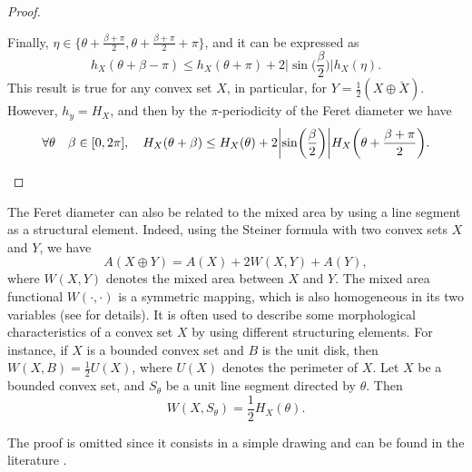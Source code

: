 \documentclass[numbers,compress,v1.0.1]{vmsta}
\theoremstyle{definition}
\begin{document}
\begin{proof}
\begin{enumerate}[1,~2,~3.]
Finally, $\eta\in\lbrace\theta+\frac{\beta+\pi}{2},\theta+\frac{\beta
+\pi}{2}+\pi\rbrace$, and it can be expressed as
%
\begin{equation*}
h_X(\theta+\beta-\pi)\leq h_X(\theta+\pi)+2\biggl\vert\sin
\biggl(\frac{\beta
}{2}\biggr)\biggr\vert h_X(\eta).
\end{equation*}
%
This result is true for any convex set $X$, in particular, for $Y=\frac
{1}{2}( X\oplus\breve{X})$. However, $h_y=H_X$, and then by the $\pi
$-periodicity of the Feret diameter we have
%
\begin{equation*}
\forall\theta \quad \beta\in[0,2\pi], \quad H_X(\theta+\beta)\leq
H_X(\theta)+ 2\biggl\vert\sin\biggl(\frac{\beta}{2}\biggr)\biggr\vert
H_X\biggl(\theta+\frac{\beta+\pi}{2} \biggr).\qedhere
\end{equation*}
\end{enumerate}
\end{proof}

The Feret diameter can also be related to the mixed area \cite
{schneider2013convex} by using a line segment as a structural element.
Indeed, using the Steiner formula \cite{schneider2013convex} with two
convex sets $X$ and $Y$, we have
%
\begin{equation*}
A(X\oplus Y)=A(X)+2W(X,Y)+A(Y),
\end{equation*}
%
where $W(X,Y)$ denotes the mixed area between $X$ and $Y$. The mixed
area functional $W(\cdot,\cdot)$ is a symmetric mapping, which is also
homogeneous in its two variables (see \citep
{Kminch,schneider2013convex} for details). It is often used to describe
some morphological characteristics of a convex set $X$ by using
different structuring elements. For instance, if $X$ is a bounded
convex set and $B$ is the unit disk, then $W(X,B)=\frac{1}{2}U(X)$,
where $U(X)$ denotes the perimeter of $X$. Let $X$ be a bounded convex
set, and $S_\theta$ be a unit line segment directed by $\theta$. Then
%
\begin{equation}
W(X,S_\theta)=\frac{1}{2}H_X(\theta). \label{eq:MixedAreatFerteseg}
\end{equation}

The proof is omitted since it consists in a simple drawing and can be
found in the literature \citep{GSI,Kminch}.
\end{document}
